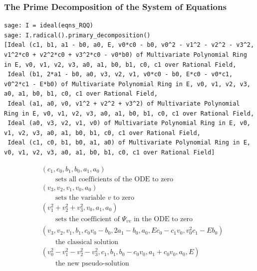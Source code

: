 \documentclass{beamer}
\begin{document}
\begin{frame}[fragile]
\frametitle{The Prime Decomposition of the System of Equations}
{\tiny\begin{verbatim}
sage: I = ideal(eqns_RQQ)
sage: I.radical().primary_decomposition()
[Ideal (c1, b1, a1 - b0, a0, E, v0*c0 - b0, v0^2 - v1^2 - v2^2 - v3^2, v1^2*c0 + v2^2*c0 + v3^2*c0 - v0*b0) of Multivariate Polynomial Ring in E, v0, v1, v2, v3, a0, a1, b0, b1, c0, c1 over Rational Field,
 Ideal (b1, 2*a1 - b0, a0, v3, v2, v1, v0*c0 - b0, E*c0 - v0*c1, v0^2*c1 - E*b0) of Multivariate Polynomial Ring in E, v0, v1, v2, v3, a0, a1, b0, b1, c0, c1 over Rational Field,
 Ideal (a1, a0, v0, v1^2 + v2^2 + v3^2) of Multivariate Polynomial Ring in E, v0, v1, v2, v3, a0, a1, b0, b1, c0, c1 over Rational Field,
 Ideal (a0, v3, v2, v1, v0) of Multivariate Polynomial Ring in E, v0, v1, v2, v3, a0, a1, b0, b1, c0, c1 over Rational Field,
 Ideal (c1, c0, b1, b0, a1, a0) of Multivariate Polynomial Ring in E, v0, v1, v2, v3, a0, a1, b0, b1, c0, c1 over Rational Field]
\end{verbatim}}

\vskip -12pt
\begin{subequations}
\label{ideal}
\begin{align}
& \left(c_{1}, c_{0}, b_{1}, b_{0}, a_{1}, a_{0}\right)\label{ideal:5} \\
& \qquad \text{sets all coefficients of the ODE to zero} \nonumber \\
& \left(v_{3}, v_{2}, v_{1}, v_{0}, a_{0}\right)\label{ideal:4}\\
& \qquad \text{sets the variable $v$ to zero} \nonumber \\
& \left(v_{1}^{2} + v_{2}^{2} + v_{3}^{2}, v_{0}, a_{1}, a_{0}\right)\label{ideal:3}\\
& \qquad \text{sets the coefficient of $\Psi_{vv}$ in the ODE to zero} \nonumber \\
& \left(v_{3}, v_{2}, v_{1}, b_{1}, c_{0} v_{0} - b_{0}, 2 a_{1} - b_{0}, a_{0}, E c_{0} - c_{1} v_{0}, v_0^2 c_1 - E b_0\right)\label{ideal:2}\\
& \qquad \text{the classical solution} \nonumber \\
& \left(v_{0}^{2} - v_{1}^{2} - v_{2}^{2} - v_{3}^{2}, c_{1}, b_{1}, b_{0} - c_{0} v_{0}, a_{1} + c_{0} v_{0}, a_{0}, E\right)\label{ideal:1}\\
& \qquad \text{the new pseudo-solution} \nonumber
\end{align}
\end{subequations}
\end{frame}
\end{document}
